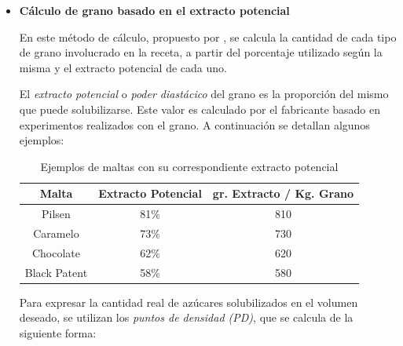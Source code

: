                 \begin{itemize}
                    \item \textbf{Cálculo de grano basado en el extracto potencial}
                    \par En este método de cálculo, propuesto por \cite{DanielRay}, se calcula la cantidad de cada tipo de grano involucrado en la receta, a partir del porcentaje utilizado según la misma y el extracto potencial de cada uno. 
                    
                        \par El \textit{extracto potencial} o \textit{poder diastácico} del grano es la proporción del mismo que puede solubilizarse. Este valor es calculado por el fabricante basado en experimentos realizados con el grano. A continuación se detallan algunos ejemplos: 
                        \begin{table}[H]
                            \centering
                            \begin{tabular}{| c | c | c |}
                                \hline
                                Malta & Extracto Potencial & gr. Extracto / Kg. Grano \\
                                \hline
                                \hline
                                Pilsen & 81\% & 810
                                \\\hline
                                Caramelo & 73\%  & 730
                                \\\hline
                                Chocolate & 62\% & 620
                                \\\hline
                                Black Patent & 58\% & 580
                                \\\hline
                            \end{tabular}
                            \caption{Ejemplos de maltas con su correspondiente extracto potencial}
                            \label{tab:TablaExtractoPotencial}
                        \end{table}
                        
                        \par Para expresar la cantidad real de azúcares solubilizados en el volumen deseado, se utilizan los \textit{puntos de densidad (PD)}, que se calcula de la siguiente forma:
                        

\end{itemize}
